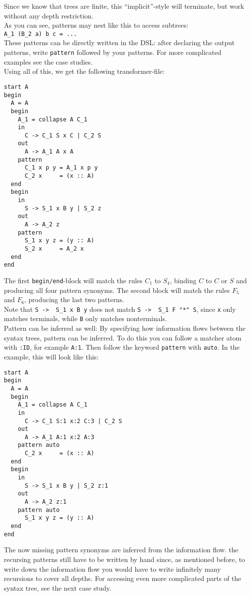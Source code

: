 \documentclass[a4paper]{article}
\begin{document}
Since we know that trees are finite, this ``implicit''-style will terminate, but work without any depth restriction.\\
As you can see, patterns may nest like this to access subtrees:\\
\lstinline{A_1 (B_2 a) b c = ...}\\
These patterns can be directly written in the DSL: after declaring the output patterns, write \lstinline{pattern} followed by your patterns. For more complicated examples see the case studies.\\
Using all of this, we get the following transformer-file:
\begin{lstlisting}[language=transformer]
start A
begin
  A = A
  begin
    A_1 = collapse A C_1 
    in
      C -> C_1 S x C | C_2 S
    out
      A -> A_1 A x A
    pattern
      C_1 x p y = A_1 x p y
      C_2 x     = (x :: A)
  end
  begin
    in
      S -> S_1 x B y | S_2 z
    out
      A -> A_2 z
    pattern 
      S_1 x y z = (y :: A)
      S_2 x     = A_2 x
  end  
end
\end{lstlisting}
The first \lstinline{begin/end}-block will match the rules $C_1$ to $S_4$, binding $C$ to $C$ or $S$ and producing all four pattern synonyms. The second block will match the rules $F_5$ and $F_6$, producing the last two patterns. \\
Note that \lstinline{S ->  S_1 x B y} does not match \lstinline[language=grammar]{S ->  S_1 F "*" S}, since \lstinline{x} only matches terminals, while \lstinline{B} only matches nonterminals.\\
Pattern can be inferred as well: By specifying how information flows between the syntax trees, pattern can be inferred. To do this you can follow a matcher atom with \lstinline{:ID}, for example \lstinline{A:1}. Then follow the keyword \lstinline{pattern} with \lstinline{auto}. In the example, this will look like this:
\begin{lstlisting}[language=transformer]
start A
begin
  A = A
  begin
    A_1 = collapse A C_1 
    in
      C -> C_1 S:1 x:2 C:3 | C_2 S
    out
      A -> A_1 A:1 x:2 A:3
    pattern auto
      C_2 x     = (x :: A)
  end
  begin
    in
      S -> S_1 x B y | S_2 z:1
    out
      A -> A_2 z:1
    pattern auto
      S_1 x y z = (y :: A)
  end  
end
\end{lstlisting}
The now missing pattern synonyms are inferred from the information flow. the recursing patterns still have to be written by hand since, as mentioned before, to write down the information flow you would have to write infinitely many recursions to cover all depths. For accessing even more complicated parts of the syntax tree, see the next case study.\\
\end{document}

